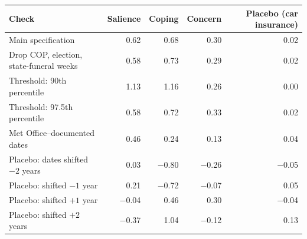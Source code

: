 \begin{tabular}{lrrrr}
\toprule
Check & Salience & Coping & Concern & Placebo (car insurance) \\
\midrule
Main specification & 0.62 & 0.68 & 0.30 & 0.02 \\
Drop COP, election, state-funeral weeks & 0.58 & 0.73 & 0.29 & 0.02 \\
Threshold: 90th percentile & 1.13 & 1.16 & 0.26 & 0.00 \\
Threshold: 97.5th percentile & 0.58 & 0.72 & 0.33 & 0.02 \\
Met Office--documented dates & 0.46 & 0.24 & 0.13 & 0.04 \\
\midrule
Placebo: dates shifted $-2$ years & 0.03 & $-$0.80 & $-$0.26 & $-$0.05 \\
Placebo: shifted $-1$ year & 0.21 & $-$0.72 & $-$0.07 & 0.05 \\
Placebo: shifted $+1$ year & $-$0.04 & 0.46 & 0.30 & $-$0.04 \\
Placebo: shifted $+2$ years & $-$0.37 & 1.04 & $-$0.12 & 0.13 \\
\bottomrule
\end{tabular}
